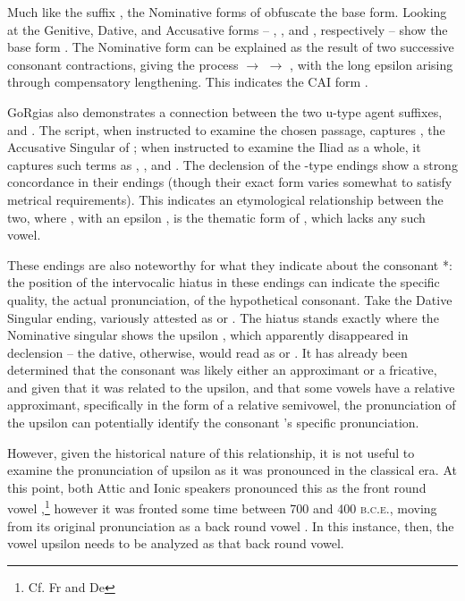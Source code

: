 Much like the suffix , the Nominative forms of 
obfuscate the base form. Looking at the Genitive, Dative, and Accusative
forms -- , , and , respectively --
show the base form . The Nominative form can be explained
as the result of two successive consonant contractions, giving the
process  $\to$  $\to$ , with
the long epsilon 
arising through compensatory
lengthening. This indicates the CAI form .

GoRgias also demonstrates a connection between the two
u-type agent suffixes,  and . The script, when
instructed to examine the chosen passage, captures , the
Accusative Singular of ; when instructed to examine the
Iliad as a whole, it captures such terms as ,
, and . The declension of the -type
endings show a strong concordance in their endings (though
their exact form varies somewhat to satisfy metrical requirements).
This indicates an etymological relationship between the two, where
, with an epsilon , is the
thematic form of , which lacks any such vowel. 



These endings are also noteworthy for what they indicate about the
consonant *\w: the position of the intervocalic hiatus in these
endings can indicate the specific quality, the actual pronunciation,
of the hypothetical consonant.
Take the Dative Singular ending, variously attested as 
or . The hiatus stands exactly where the Nominative
singular shows the upsilon , which apparently
disappeared in declension -- the dative, otherwise, would read as
 or . It has already been determined
that the consonant was likely either an approximant or a fricative,
and given that it was related to the upsilon, and that some vowels
have a relative approximant, specifically in the form of a relative
semivowel, the pronunciation of the upsilon
can potentially identify the consonant \w's specific pronunciation.

However, given the historical nature of this relationship, it is not
useful to examine the pronunciation of upsilon  as it was
pronounced in the classical era. At this point, both Attic and
Ionic speakers pronounced this as the front round vowel ,\footnote{Cf. Fr  and De } however it
was fronted some time between 700 and 400 \textsc{b.c.e.}, moving
from its original pronunciation as a back round vowel .\autocite[529]{malikouti-drachman_bortone_2015}
In this instance, then, the vowel upsilon  needs to be
analyzed as that back round vowel. 

